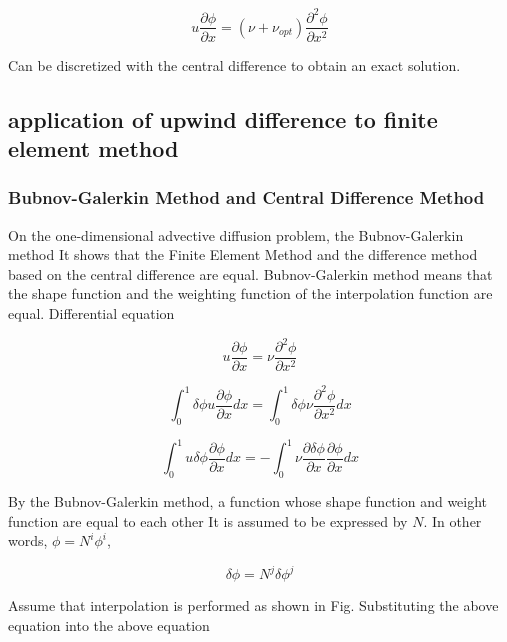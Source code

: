 \begin{equation}
u\frac{\partial\phi}{\partial x} = (\nu+\nu_{opt})\frac{\partial^2\phi}{\partial x^2}
\end{equation}

Can be discretized with the central difference to obtain an exact solution.





\subsection{application of upwind difference to finite element method}

\subsubsection{Bubnov-Galerkin Method and Central Difference Method}

On the one-dimensional advective diffusion problem, the Bubnov-Galerkin method
It shows that the Finite Element Method and the difference method based on the central difference are equal.
Bubnov-Galerkin method means that the shape function and the weighting function of the interpolation function are equal.
Differential equation

\begin{equation}
u\frac{\partial\phi}{\partial x} = \nu \frac{\partial^2 \phi}{\partial x^2}
\end{equation}


\begin{equation}
{\int^1_0}{\delta\phi}u\frac{\partial\phi}{\partial x}dx = {\int^1_0}{\delta\phi}\nu \frac{\partial^2 \phi}{\partial x^2}dx
\end{equation}


\begin{equation}
{\int^1_0}u{\delta\phi}\frac{\partial\phi}{\partial x}dx = -{\int^1_0}\nu\frac{\partial\delta\phi}{\partial x}\frac{\partial\phi}{\partial x}dx
\end{equation}

By the Bubnov-Galerkin method, a function whose shape function and weight function are equal to each other
It is assumed to be expressed by $N$. In other words,
$\phi = {N^i}{\phi^i}$,

\begin{equation}
\delta\phi = {N^j}{\delta\phi^j}
\end{equation}

Assume that interpolation is performed as shown in Fig. Substituting the above equation into the above equation

